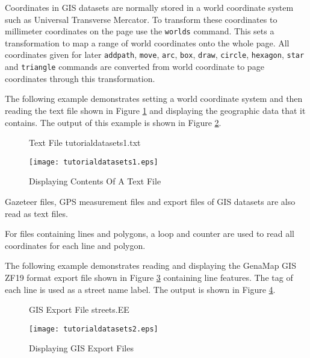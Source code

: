Coordinates in GIS datasets are normally stored
in a world coordinate system such as
Universal Transverse Mercator.  To transform these coordinates to millimeter
coordinates on the page use the \texttt{worlds} command.  This sets a
transformation to map a range of world coordinates onto the whole page.  All
coordinates given for later \texttt{addpath}, \texttt{move}, \texttt{arc},
\texttt{box},
\texttt{draw},
\texttt{circle},
\texttt{hexagon},
\texttt{star} and
\texttt{triangle}
commands are converted from world coordinate to page coordinates
through this transformation.

The following example demonstrates
setting a world coordinate system and then
reading the text file shown in Figure
\ref{tutorialdatasets1txt} and displaying the
geographic data that it contains.  The output of this example is shown in
Figure \ref{tutorialdatasets1}.

\begin{figure}[htb]

\caption{Text File tutorialdatasets1.txt}
\label{tutorialdatasets1txt}
\end{figure}



\begin{figure}[htb]
\texttt{[image: tutorialdatasets1.eps]}
\caption{Displaying Contents Of A Text File}
\label{tutorialdatasets1}
\end{figure}

Gazeteer files, GPS measurement files and export files of GIS datasets
are also read as text files.

For files containing lines and polygons, a loop and counter
are used to read all coordinates for each line and polygon.

The following example demonstrates
reading and displaying the GenaMap GIS ZF19 format export file shown in Figure
\ref{streetsEE} containing line
features.  The tag of each line is used as a street name label.
The output is shown in Figure \ref{tutorialdatasets2}.

\begin{figure}[htb]

\caption{GIS Export File streets.EE}
\label{streetsEE}
\end{figure}



\begin{figure}[htb]
\texttt{[image: tutorialdatasets2.eps]}
\caption{Displaying GIS Export Files}
\label{tutorialdatasets2}
\end{figure}

